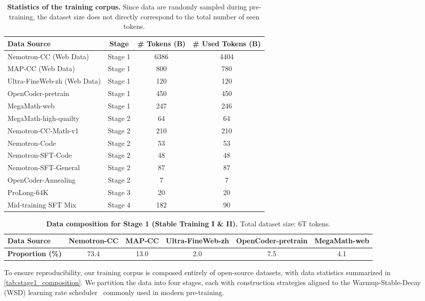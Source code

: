 \documentclass[]{bytedance_seed}
\newcommand{\1}{\mathbf{1}}
\begin{document}
\begin{table}[ht]
\label{tab:data_stat_of_training_corpus}
\small
\centering
\caption{\textbf{Statistics of the training corpus.} Since data are randomly sampled during pre-training, the dataset size does not directly correspond to the total number of seen tokens.}
\label{tab:training_data_details}
\begin{tabular}{l|ccc}
\toprule
\textbf{Data Source} & \textbf{Stage} & \textbf{\# Tokens (B)} & \textbf{\# Used Tokens (B)} \\
\hline
Nemotron-CC (Web Data) & Stage 1 & 6386 & 4404 \\
MAP-CC (Web Data) & Stage 1 & 800 & 780\\
Ultra-FineWeb-zh (Web Data) & Stage 1 & 120 & 120 \\
OpenCoder-pretrain & Stage 1 & 450 & 450 \\
MegaMath-web  & Stage 1 & 247 & 246 \\
MegaMath-high-quailty & Stage 2 & 64 & 64\\
Nemotron-CC-Math-v1 & Stage 2 & 210 & 210 \\
Nemotron-Code & Stage 2 & 53 & 53 \\
Nemotron-SFT-Code & Stage 2 & 48 & 48 \\
Nemotron-SFT-General & Stage 2 & 87 & 87 \\
OpenCoder-Annealing & Stage 2 & 7 & 7  \\
ProLong-64K & Stage 3 & 20 & 20 \\
Mid-training SFT Mix & Stage 4 & 182 & 90 \\
\bottomrule
\end{tabular}
\end{table}

\begin{table}[ht]
\small
\centering
\caption{\textbf{Data composition for Stage 1 (Stable Training I \& II).} Total dataset size: 6T tokens.}
\label{tab:stage1_composition}
\begin{tabular}{l|ccccc}
\toprule
\textbf{Data Source} & Nemotron-CC&MAP-CC&Ultra-FineWeb-zh&OpenCoder-pretrain&MegaMath-web \\
\midrule
\textbf{Proportion (\%)} & 73.4 & 13.0 & 2.0 & 7.5 & 4.1 \\
\bottomrule
\end{tabular}
\end{table}

To ensure reproducibility, our training corpus is composed entirely of open-source datasets, with data statistics summarized in \autoref{tab:stage1_composition}. We partition the data into four  stages, each with construction strategies aligned to the Warmup-Stable-Decay (WSD) learning rate scheduler~\cite{wen2024understanding} commonly used in modern pre-training.
\end{document}
